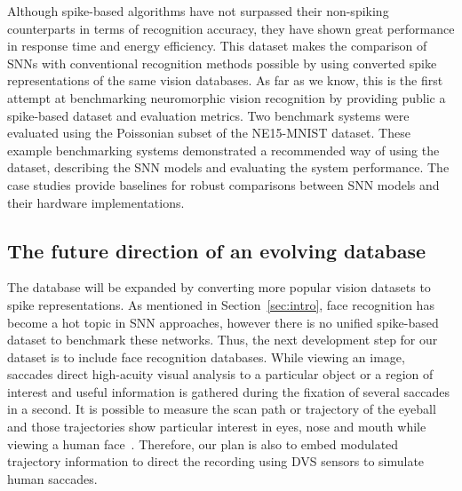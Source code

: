 \documentclass{frontiersENG} %
\begin{document}
Although spike-based algorithms have not surpassed their non-spiking counterparts in terms of recognition accuracy, they have shown great performance in response time and energy efficiency.
This dataset makes the comparison of SNNs with conventional recognition methods possible by using converted spike representations of the same vision databases.
As far as we know, this is the first attempt at benchmarking neuromorphic vision recognition by providing public a spike-based dataset and evaluation metrics.
Two benchmark systems were evaluated using the Poissonian subset of the NE15-MNIST dataset.
These example benchmarking systems demonstrated a recommended way of using the dataset, describing the SNN models and evaluating the system performance.
The case studies provide baselines for robust comparisons between SNN models and their hardware implementations.

\subsection{The future direction of an evolving database}
The database will be expanded by converting more popular vision datasets to spike representations.
As mentioned in Section~\ref{sec:intro}, face recognition has become a hot topic in SNN approaches, however there is no unified spike-based dataset to benchmark these networks.
Thus, the next development step for our dataset is to include face recognition databases.
While viewing an image, saccades direct high-acuity visual analysis to a particular object or a region of interest and useful information is gathered during the fixation of several saccades in a second.
It is possible to measure the scan path or trajectory of the eyeball and those trajectories show particular interest in eyes, nose and mouth while viewing a human face~\citep{yarbus1967eye}.
Therefore, our plan is also to embed modulated trajectory information to direct the recording using DVS sensors to simulate human saccades.
\end{document}
